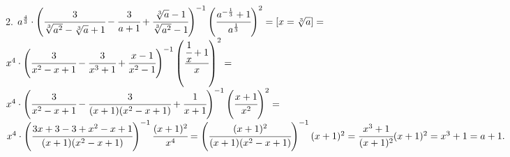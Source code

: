2. $a^{\frac{4}{3}}\cdot\left(\cfrac{3}{\sqrt[3]{a^2}-\sqrt[3]{a}+1}-
\cfrac{3}{a+1}+\cfrac{\sqrt[3]{a}-1}{\sqrt[3]{a^2}-1}\right)^{-1}
\left(\cfrac{a^{-\frac{1}{3}}+1}{a^\frac{1}{3}}\right)^2=[x=\sqrt[3]{a}]=$\\$
x^4\cdot\left(\cfrac{3}{x^2-x+1}-\cfrac{3}{x^3+1}+\cfrac{x-1}{x^2-1}\right)^{-1}\left(\cfrac{\cfrac{1}{x}+1}{x}\right)^2=$\\$
x^4\cdot\left(\cfrac{3}{x^2-x+1}-\cfrac{3}{(x+1)(x^2-x+1)}+\cfrac{1}{x+1}\right)^{-1}\left(\cfrac{x+1}{x^2}\right)^2=$\\$
x^4\cdot\left(\cfrac{3x+3-3+x^2-x+1}{(x+1)(x^2-x+1)}\right)^{-1}\cfrac{(x+1)^2}{x^4}=
\left(\cfrac{(x+1)^2}{(x+1)(x^2-x+1)}\right)^{-1}(x+1)^2=\cfrac{x^3+1}{(x+1)^2}(x+1)^2=x^3+1=a+1.$\\
